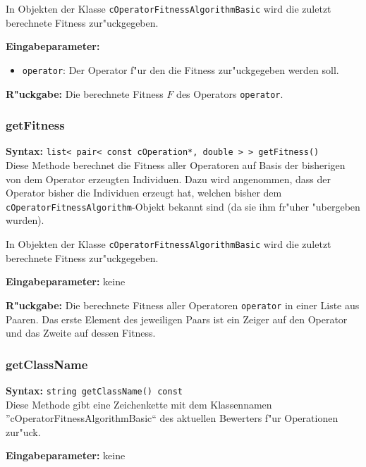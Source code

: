 In Objekten der Klasse \verb|cOperatorFitnessAlgorithmBasic| wird die zuletzt berechnete Fitness zur"uckgegeben.

\bigskip\noindent
\textbf{Eingabeparameter:}
\begin{itemize}
 \item \verb|operator|: Der Operator f"ur den die Fitness zur"uckgegeben werden soll.
\end{itemize}

\bigskip\noindent
\textbf{R"uckgabe:} Die berechnete Fitness $F$ des Operators \verb|operator|.


\subsubsection{getFitness}

\textbf{Syntax:} \verb|list< pair< const cOperation*, double > > getFitness()| \\

Diese Methode berechnet die Fitness aller Operatoren auf Basis der bisherigen von dem Operator erzeugten Individuen. Dazu wird angenommen, dass der Operator bisher die Individuen erzeugt hat, welchen bisher dem \verb|cOperatorFitnessAlgorithm|-Objekt bekannt sind (da sie ihm fr"uher "ubergeben wurden).

In Objekten der Klasse \verb|cOperatorFitnessAlgorithmBasic| wird die zuletzt berechnete Fitness zur"uckgegeben.

\bigskip\noindent
\textbf{Eingabeparameter:} keine

\bigskip\noindent
\textbf{R"uckgabe:} Die berechnete Fitness aller Operatoren \verb|operator| in einer Liste aus Paaren. Das erste Element des jeweiligen Paars ist ein Zeiger auf den Operator und das Zweite auf dessen Fitness.


\subsubsection{getClassName}

\textbf{Syntax:} \verb|string getClassName() const| \\

Diese Methode gibt eine Zeichenkette mit dem Klassennamen ''cOperatorFitnessAlgorithmBasic`` des aktuellen Bewerters f"ur Operationen zur"uck.

\bigskip\noindent
\textbf{Eingabeparameter:} keine

